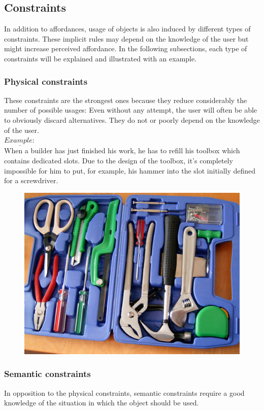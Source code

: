 \documentclass[a4paper,11pt] {article}
\theoremstyle{definition}
\begin{document}
    \subsection{Constraints}
    In addition to affordances, usage of objects is also induced by different types of constraints. These implicit rules may depend on the knowledge of the user but might increase perceived affordance. In the following subsections, each type of constraints will be explained and illustrated with an example.
        \subsubsection{Physical constraints}
        These constraints are the strongest ones because they reduce considerably the number of possible 	usages: Even without any attempt, the user will often be able to obviously discard  alternatives. They do not or poorly depend on the knowledge of the user.\\

        $\underline{Example:}$\\
        When a builder has just finished his work, he has to refill his toolbox which contains dedicated slots. Due to the design of the toolbox, it's completely impossible for him to put, for example, his hammer into the slot initially defined for a screwdriver.
        \begin{figure}[h]
        \centering
        \includegraphics[scale=0.1]{fig-report/toolbox.jpg}
        \end{figure}

        \subsubsection{Semantic constraints}
       In opposition to the physical constraints, semantic constraints require a good knowledge of the situation in which the object should be used.\\
\end{document}
